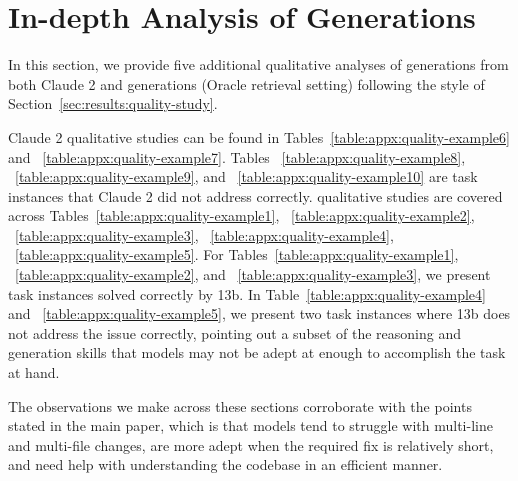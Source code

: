 \section{In-depth Analysis of \swellama{} Generations}
\label{appx:extra-results:quality-in-depth}

In this section, we provide five additional qualitative analyses of generations from both Claude 2 and \swellama{} generations (Oracle retrieval setting) following the style of Section~\ref{sec:results:quality-study}.

Claude 2 qualitative studies can be found in Tables~\ref{table:appx:quality-example6} and ~\ref{table:appx:quality-example7}.
Tables ~\ref{table:appx:quality-example8}, ~\ref{table:appx:quality-example9}, and ~\ref{table:appx:quality-example10} are task instances that Claude 2 did not address correctly.
\swellama{} qualitative studies are covered across Tables~\ref{table:appx:quality-example1}, ~\ref{table:appx:quality-example2}, ~\ref{table:appx:quality-example3}, ~\ref{table:appx:quality-example4}, ~\ref{table:appx:quality-example5}.
For Tables~\ref{table:appx:quality-example1}, ~\ref{table:appx:quality-example2}, and ~\ref{table:appx:quality-example3}, we present task instances solved correctly by \swellama{} 13b.
In Table~\ref{table:appx:quality-example4} and ~\ref{table:appx:quality-example5}, we present two task instances where \swellama{} 13b does not address the issue correctly, pointing out a subset of the reasoning and generation skills that models may not be adept at enough to accomplish the task at hand.

The observations we make across these sections corroborate with the points stated in the main paper, which is that models tend to struggle with multi-line and multi-file changes, are more adept when the required fix is relatively short, and need help with understanding the codebase in an efficient manner.










